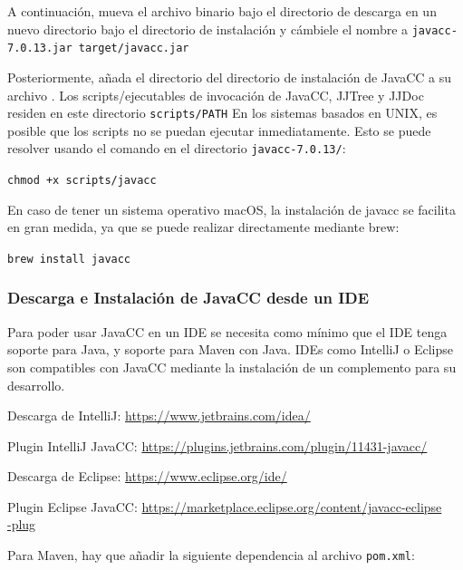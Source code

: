 A continuación, mueva el archivo binario bajo el directorio de descarga en un nuevo directorio bajo el directorio de instalación y cámbiele el nombre a \lstinline|javacc-7.0.13.jar target/javacc.jar|


Posteriormente, añada el directorio del directorio de instalación de JavaCC a su archivo . Los scripts/ejecutables de invocación de JavaCC, JJTree y JJDoc residen en este directorio \lstinline|scripts/PATH|
En los sistemas basados en UNIX, es posible que los scripts no se puedan ejecutar inmediatamente. Esto se puede resolver usando el comando en el directorio \lstinline|javacc-7.0.13/|:

\begin{center}
    \lstinline|chmod +x scripts/javacc|
\end{center}

En caso de tener un sistema operativo macOS, la instalación de javacc se facilita en gran medida, ya que se puede realizar directamente mediante brew:

\begin{center}
    \lstinline|brew install javacc|
\end{center}


\subsubsection{Descarga e Instalación de JavaCC desde un IDE}

Para poder usar JavaCC en un IDE se necesita como mínimo que el IDE tenga soporte para Java, y soporte para Maven con Java. IDEs como IntelliJ o Eclipse son compatibles con JavaCC mediante la instalación de un complemento para su desarrollo.

Descarga de IntelliJ: \href{https://www.jetbrains.com/idea/}{https://www.jetbrains.com/idea/}

Plugin IntelliJ JavaCC: \href{https://plugins.jetbrains.com/plugin/11431-javacc/}{https://plugins.jetbrains.com/plugin/11431-javacc/}

Descarga de Eclipse: \href{https://www.eclipse.org/ide/}{https://www.eclipse.org/ide/}

Plugin Eclipse JavaCC: \href{https://marketplace.eclipse.org/content/javacc-eclipse-plug}{https://marketplace.eclipse.org/content/javacc-eclipse\\-plug}

Para Maven, hay que añadir la siguiente dependencia al archivo \lstinline|pom.xml|:


\lstset{inputencoding=utf8/latin1}


